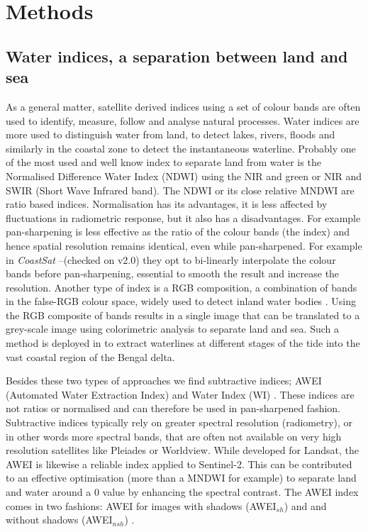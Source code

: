 \documentclass[remotesensing,technicalnote,submit,pdftex,moreauthors]{Definitions/mdpi}
\begin{document}
\section{Methods}
\subsection{Water indices, a separation between land and sea}
As a general matter, satellite derived indices using a set of colour bands are often used to identify, measure, follow and analyse natural processes. Water indices are more used to distinguish water from land, to detect lakes, rivers, floods and similarly in the coastal zone to detect the instantaneous waterline. Probably one of the most used and well know index to separate land from water is the Normalised Difference Water Index (NDWI) \citep{GAO:1996, McFEETERS:1996} using the NIR and green or NIR and SWIR (Short Wave Infrared band). The NDWI or its close relative MNDWI \citep{Xu:2006} are ratio based indices. Normalisation has its advantages, it is less affected by fluctuations in radiometric response, but it also has a disadvantages. For example pan-sharpening is less effective as the ratio of the colour bands (the index) and hence spatial resolution remains identical, even while pan-sharpened. For example in \textit{CoastSat} --(checked on v2.0) they opt to bi-linearly interpolate the colour bands before pan-sharpening, essential to smooth the result and increase the resolution. Another type of index is a RGB composition, a combination of bands in the false-RGB colour space, widely used to detect inland water bodies \citep{PEKEL2014704}. Using the RGB composite of bands results in a single image that can be translated to a grey-scale image using colorimetric analysis to separate land and sea. Such a method is deployed in \citet{Khan2019} to extract waterlines at different stages of the tide into the vast coastal region of the Bengal delta. 

Besides these two types of approaches we find subtractive indices; AWEI (Automated Water Extraction Index) \citep{FEYISA201423} and Water Index (WI) \citep{FISHER2016167}. These indices are not ratios or normalised and can therefore be used in pan-sharpened fashion. Subtractive indices typically rely on greater spectral resolution (radiometry), or in other words more spectral bands, that are often not available on very high resolution satellites like Pleiades or Worldview. While developed for Landsat, the AWEI is likewise a reliable index applied to Sentinel-2. This can be contributed to an effective optimisation (more than a MNDWI for example) to separate land and water around a 0 value by enhancing the spectral contrast. The AWEI index comes in two fashions: AWEI for images with shadows (AWEI$_{sh}$) and and without shadows (AWEI$_{nsh}$) \citep{FEYISA201423}.
\end{document}
